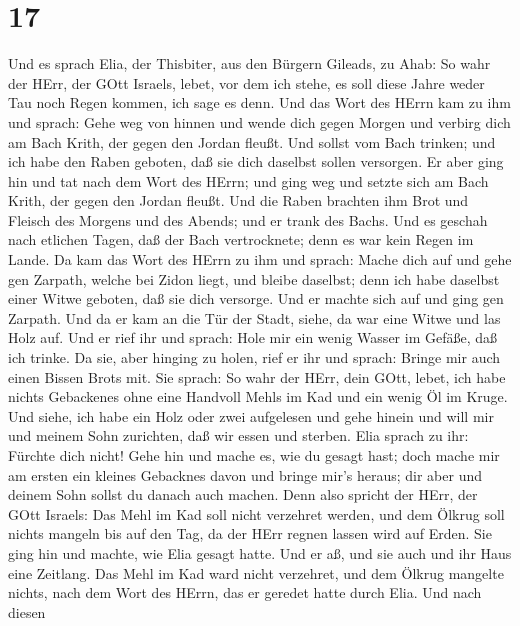 \hypertarget{section-16}{%
\section{17}\label{section-16}}

 Und es sprach Elia, der Thisbiter, aus den Bürgern Gileads,
zu Ahab: So wahr der HErr, der GOtt Israels, lebet, vor dem ich stehe,
es soll diese Jahre weder Tau noch Regen kommen, ich sage es denn.
 Und das Wort des HErrn kam zu ihm und sprach: 
Gehe weg von hinnen und wende dich gegen Morgen und verbirg dich am Bach
Krith, der gegen den Jordan fleußt.  Und sollst vom Bach
trinken; und ich habe den Raben geboten, daß sie dich daselbst sollen
versorgen.  Er aber ging hin und tat nach dem Wort des
HErrn; und ging weg und setzte sich am Bach Krith, der gegen den Jordan
fleußt.  Und die Raben brachten ihm Brot und Fleisch des
Morgens und des Abends; und er trank des Bachs.  Und es
geschah nach etlichen Tagen, daß der Bach vertrocknete; denn es war kein
Regen im Lande.  Da kam das Wort des HErrn zu ihm und
sprach:  Mache dich auf und gehe gen Zarpath, welche bei
Zidon liegt, und bleibe daselbst; denn ich habe daselbst einer Witwe
geboten, daß sie dich versorge.  Und er machte sich auf und
ging gen Zarpath. Und da er kam an die Tür der Stadt, siehe, da war eine
Witwe und las Holz auf. Und er rief ihr und sprach: Hole mir ein wenig
Wasser im Gefäße, daß ich trinke.  Da sie, aber hinging zu
holen, rief er ihr und sprach: Bringe mir auch einen Bissen Brots mit.
 Sie sprach: So wahr der HErr, dein GOtt, lebet, ich habe
nichts Gebackenes ohne eine Handvoll Mehls im Kad und ein wenig Öl im
Kruge. Und siehe, ich habe ein Holz oder zwei aufgelesen und gehe hinein
und will mir und meinem Sohn zurichten, daß wir essen und sterben.
 Elia sprach zu ihr: Fürchte dich nicht! Gehe hin und mache
es, wie du gesagt hast; doch mache mir am ersten ein kleines Gebacknes
davon und bringe mir's heraus; dir aber und deinem Sohn sollst du danach
auch machen.  Denn also spricht der HErr, der GOtt Israels:
Das Mehl im Kad soll nicht verzehret werden, und dem Ölkrug soll nichts
mangeln bis auf den Tag, da der HErr regnen lassen wird auf Erden.
 Sie ging hin und machte, wie Elia gesagt hatte. Und er aß,
und sie auch und ihr Haus eine Zeitlang.  Das Mehl im Kad
ward nicht verzehret, und dem Ölkrug mangelte nichts, nach dem Wort des
HErrn, das er geredet hatte durch Elia.  Und nach diesen
